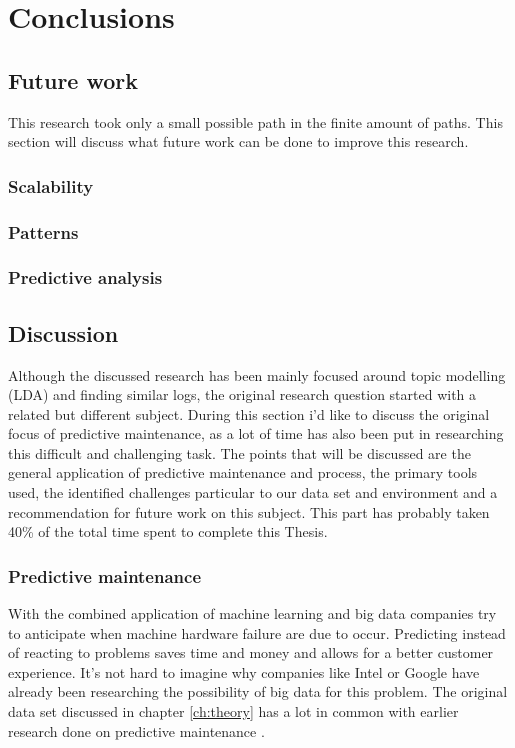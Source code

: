 \chapter{Conclusions} \label{ch:conclusions}

\section {Future work}
This research took only a small possible path in the finite amount of paths. This section will discuss what future work can be done to improve this research.

\subsection{Scalability}

\subsection{Patterns}

\subsection{Predictive analysis}


\section{Discussion}
Although the discussed research has been mainly focused around topic modelling (LDA) and finding similar logs, the original research question started with a related but different subject. During this section i'd like to discuss the original focus of predictive maintenance, as a lot of time has also been put in researching this difficult and challenging task. The points that will be discussed are the general application of predictive maintenance and process, the primary tools used, the identified challenges particular to our data set and environment and a recommendation for future work on this subject. This part has probably taken 40\% of the total time spent to complete this Thesis.

\subsection{Predictive maintenance}
With the combined application of machine learning and big data companies try to anticipate when machine hardware failure are due to occur. Predicting instead of reacting to problems saves time and money and allows for a better customer experience. It's not hard to imagine why companies like Intel \cite{AjayChandramoulyRavindraNarkhedeVijayMungaraGuillermoRueda2013ReducingAnalytics} or Google have already been researching the possibility of big data for this problem. 
The original data set discussed in chapter \ref{ch:theory} has a lot in common with earlier research done on predictive maintenance \cite{Sipos2014Log-basedMaintenance}.

